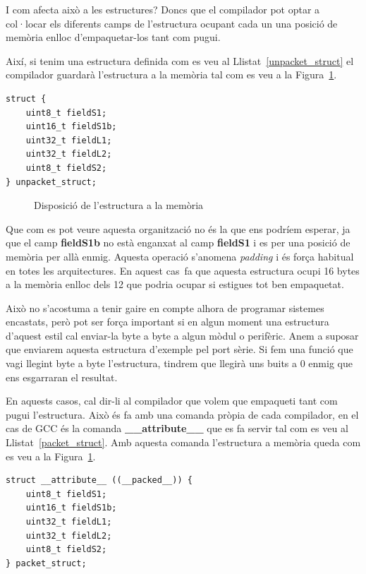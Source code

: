 I com afecta això a les estructures? Doncs que el compilador pot optar a col·locar els diferents camps de l'estructura ocupant cada un una posició de memòria enlloc d'empaquetar-los tant com pugui.

Així, si tenim una estructura definida com es veu al Llistat~\ref{unpacket_struct} el compilador guardarà l'estructura a la memòria tal com es veu a la Figura~\ref{fig:UnpackedMemoryStructure}. 

\begin{lstlisting}[style=customc,caption={Estructura d'exemple},label=unpacket_struct]
 struct {
	uint8_t fieldS1;
	uint16_t fieldS1b;
	uint32_t fieldL1;
	uint32_t fieldL2;
	uint8_t fieldS2;
} unpacket_struct;
\end{lstlisting}


\begin{figure}
 \centering
 \caption{Disposició de l'estructura a la memòria}
 \label{fig:UnpackedMemoryStructure}
\end{figure}

Que com es pot veure aquesta organització no és la que ens podríem esperar, ja que el camp {\bf fieldS1b} no està enganxat al camp {\bf fieldS1} i es per una posició de memòria per allà enmig. Aquesta operació s'anomena {\em padding} i és força habitual en totes les arquitectures. En aquest cas fa que aquesta estructura ocupi 16 bytes a la memòria enlloc dels 12 que podria ocupar si estigues tot ben empaquetat.

Això no s'acostuma a tenir gaire en compte alhora de programar sistemes encastats, però pot ser força important si en algun moment una estructura d'aquest estil cal enviar-la byte a byte a algun mòdul o perifèric. Anem a suposar que enviarem aquesta estructura d'exemple pel port sèrie. Si fem una funció que vagi llegint byte a byte l'estructura, tindrem que llegirà uns buits a 0 enmig que ens esgarraran el resultat.

En aquests casos, cal dir-li al compilador que volem que empaqueti tant com pugui l'estructura. Això és fa amb una comanda pròpia de cada compilador, en el cas de GCC és la comanda {\bf \_\_attribute\_\_} que es fa servir tal com es veu al Llistat~\ref{packet_struct}. Amb aquesta comanda l'estructura a memòria queda com es veu  a la Figura~\ref{fig:UnpackedMemoryStructure}.


\begin{lstlisting}[style=customc,caption={Estructura d'exemple empaquetada},label=packet_struct]
struct __attribute__ ((__packed__)) {
	uint8_t fieldS1;
	uint16_t fieldS1b;
	uint32_t fieldL1;
	uint32_t fieldL2;
	uint8_t fieldS2;
} packet_struct;
\end{lstlisting}


